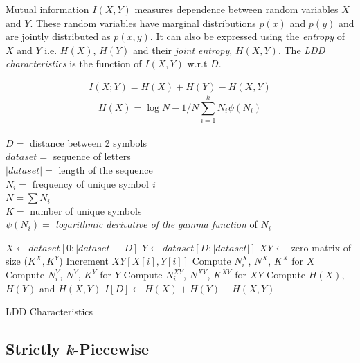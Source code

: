 \documentclass[a0,portrait]{a0poster}
\begin{document}
\begin{multicols}{2}
\color{black}

Mutual information $I(X,Y)$ measures dependence between random variables $X$ and $Y$. These random variables have marginal distributions $p(x)$ and $p(y)$ and are jointly distributed as $p(x,y)$. It can also be expressed using the \emph{entropy} of $X$ and $Y$ i.e. $H(X)$, $H(Y)$ and their \emph{joint entropy}, $H(X,Y)$. The \emph{LDD characteristics} is the function of $I(X,Y)$ w.r.t $D$.

\begin{multicols}{2}
\begin{equation*}
\begin{aligned}
I(X;Y) = H(X) + H(Y) - H(X,Y)
\label{eq:mut-inf-h}
\end{aligned}
\end{equation*}
\begin{equation*}
H(X) = \log N - 1/N \sum_{i=1}^{k} N_i \psi(N_i)
\label{eq:entropy-adj}
\end{equation*}
\\
$D=$ distance between 2 symbols \\
$dataset=$ sequence of letters \\
$|dataset|=$ length of the sequence \\
$N_i=$ frequency of unique symbol \emph{i} \\
$N = \sum N_i$ \\
$K=$ number of unique symbols \\
$\psi(N_i)=$ \emph{logarithmic derivative of the gamma function} of $N_i$ \\
\columnbreak
\begin{algorithm}[H]
\begin{algorithmic}
  \State $X \gets dataset[0:|dataset|-D]$
  \State $Y \gets dataset[D:|dataset|]$
  \State $XY \gets$ zero-matrix of size ($K^X,K^Y$)
    \State Increment $XY[X[i],Y[i]]$
  \EndFor
  \State Compute $N_i^X$, $N^X$, $K^X$ for $X$
  \State Compute $N_i^Y$, $N^Y$, $K^Y$ for $Y$
  \State Compute $N_i^{XY}$, $N^{XY}$, $K^{XY}$ for $XY$
  \State Compute $H(X)$, $H(Y)$ and $H(X,Y)$
  \State $I[D]\gets H(X)+H(Y)-H(X,Y)$
 \EndFor
\caption{LDD Characteristics}\label{ldd_algo}
\end{algorithmic}
\end{algorithm}
\end{multicols}

\color{tudLogoColor}

\subsection*{Strictly \emph{k}-Piecewise}


\end{multicols}
\end{document}
